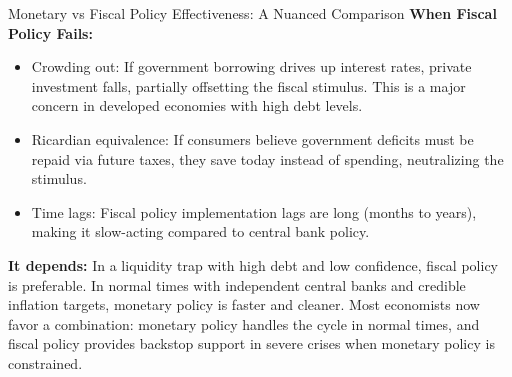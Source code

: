 \documentclass[11pt, a4paper, twoside]{book}
\begin{document}
\begin{evaluation}{Monetary vs Fiscal Policy Effectiveness: A Nuanced Comparison}
\textbf{When Fiscal Policy Fails:}
\begin{itemize}
  \item Crowding out: If government borrowing drives up interest rates, private investment falls, partially offsetting the fiscal stimulus. This is a major concern in developed economies with high debt levels.
  \item Ricardian equivalence: If consumers believe government deficits must be repaid via future taxes, they save today instead of spending, neutralizing the stimulus.
  \item Time lags: Fiscal policy implementation lags are long (months to years), making it slow-acting compared to central bank policy.
\end{itemize}

\textbf{It depends:}
In a liquidity trap with high debt and low confidence, fiscal policy is preferable. In normal times with independent central banks and credible inflation targets, monetary policy is faster and cleaner. Most economists now favor a combination: monetary policy handles the cycle in normal times, and fiscal policy provides backstop support in severe crises when monetary policy is constrained.
\end{evaluation}
\end{document}
